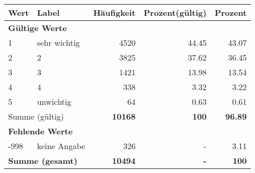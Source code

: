     \begin{longtable}{lXrrr}
     \toprule
     \textbf{Wert} & \textbf{Label} & \textbf{Häufigkeit} & \textbf{Prozent(gültig)} & \textbf{Prozent} \\
     \endhead
     \midrule
     \multicolumn{5}{l}{\textbf{Gültige Werte}}\\

     1 &
     \multicolumn{1}{X}{ sehr wichtig   } &


       \num{4520} &
       \num[round-mode=places,round-precision=2]{44,45} &
         \num[round-mode=places,round-precision=2]{43,07} \\

     2 &
     \multicolumn{1}{X}{ 2   } &


       \num{3825} &
       \num[round-mode=places,round-precision=2]{37,62} &
         \num[round-mode=places,round-precision=2]{36,45} \\

     3 &
     \multicolumn{1}{X}{ 3   } &


       \num{1421} &
       \num[round-mode=places,round-precision=2]{13,98} &
         \num[round-mode=places,round-precision=2]{13,54} \\

     4 &
     \multicolumn{1}{X}{ 4   } &


       \num{338} &
       \num[round-mode=places,round-precision=2]{3,32} &
         \num[round-mode=places,round-precision=2]{3,22} \\

     5 &
     \multicolumn{1}{X}{ unwichtig   } &


       \num{64} &
       \num[round-mode=places,round-precision=2]{0,63} &
         \num[round-mode=places,round-precision=2]{0,61} \\
     \midrule
     \multicolumn{2}{l}{Summe (gültig)} &
       \textbf{\num{10168}} &
     \textbf{100} &
       \textbf{\num[round-mode=places,round-precision=2]{96,89}} \\
     \multicolumn{5}{l}{\textbf{Fehlende Werte}}\\
       -998 &
       keine Angabe &
         \num{326} &
        - &
         \num[round-mode=places,round-precision=2]{3,11} \\
     \midrule
     \multicolumn{2}{l}{\textbf{Summe (gesamt)}} &
          \textbf{\num{10494}} &
        \textbf{-} &
        \textbf{100} \\
     \bottomrule
     \end{longtable}
     
